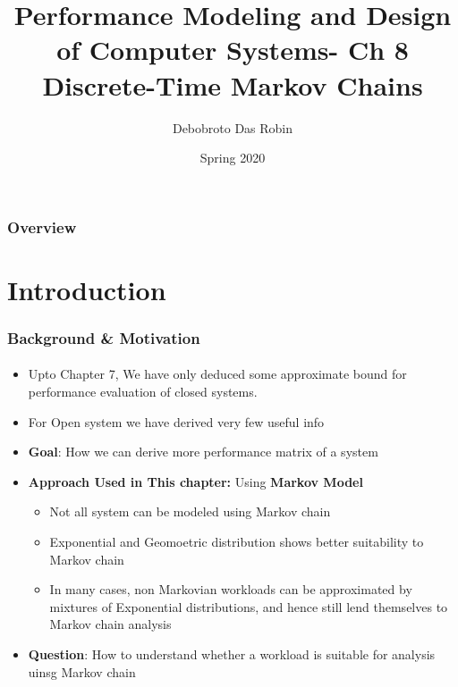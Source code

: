 \documentclass{beamer}
\title{Performance Modeling and
Design of Computer Systems- Ch 8 \\
Discrete-Time Markov Chains}
\author{Debobroto Das Robin} %
\institute{Kent State University}
\date{Spring 2020}
\begin{document}
\begin{frame}
        \titlepage
        \begin{center}
    \href{mailto:drobin@kent.edu}{}
        \end{center}
\end{frame}

\begin{frame}
\frametitle{Overview} %
\tableofcontents %
\end{frame}



\section{Introduction}



\begin{frame}
\frametitle{  Background \& Motivation}
\framesubtitle{\textbf{\textit{}}}
\begin{itemize}
\item Upto Chapter 7, We have only deduced some approximate bound for performance evaluation of closed systems. 
\item For Open system we have derived very few useful info
\item \textbf{Goal}: How we can derive more performance matrix of a system
\item \textbf{Approach Used in This chapter:}  Using \textbf{Markov Model}
\begin{itemize}
\item Not all system can be modeled using Markov chain
\item Exponential and Geomoetric distribution shows better suitability to Markov chain
\item In many cases, non Markovian workloads can be approximated by mixtures of Exponential distributions, and hence still lend themselves to Markov chain analysis

\end{itemize}
\item \textbf{Question}: How to understand whether a workload is suitable for analysis uinsg Markov chain
\end{itemize}
	
\end{frame}
\end{document}
